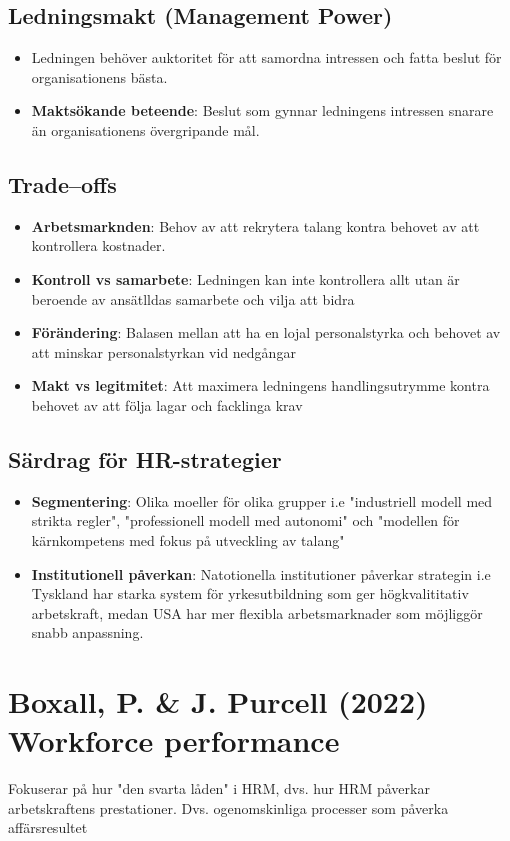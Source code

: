 \documentclass[12pt,a4paper]{article}
\begin{document}
\subsection{Ledningsmakt (Management Power)}
\begin{itemize}
    \item Ledningen behöver auktoritet för att samordna intressen och fatta beslut för organisationens bästa.
    \item \textbf{Maktsökande beteende}: Beslut som gynnar ledningens intressen snarare än organisationens övergripande mål.
\end{itemize}

\subsection{Trade--offs}
\begin{itemize}
    \item \textbf{Arbetsmarknden}: Behov av att rekrytera talang kontra behovet av att kontrollera kostnader.
    \item \textbf{Kontroll vs samarbete}: Ledningen kan inte kontrollera allt utan är beroende av ansätlldas samarbete och vilja att bidra
    \item \textbf{Förändering}: Balasen mellan att ha en lojal personalstyrka och behovet av att minskar personalstyrkan vid nedgångar
    \item \textbf{Makt vs legitmitet}: Att maximera ledningens handlingsutrymme kontra behovet av att följa lagar och facklinga krav
\end{itemize}

\subsection{Särdrag för HR-strategier}
\begin{itemize}
    \item \textbf{Segmentering}: Olika moeller för olika grupper i.e "industriell modell med strikta regler", "professionell modell med autonomi" och "modellen för kärnkompetens med fokus på utveckling av talang"
    \item \textbf{Institutionell påverkan}: Natotionella institutioner påverkar strategin i.e Tyskland har starka system för yrkesutbildning som ger högkvalititativ arbetskraft, medan USA har mer flexibla arbetsmarknader som möjliggör snabb anpassning.
\end{itemize}

\section{Boxall, P. \& J. Purcell (2022) Workforce performance}
Fokuserar på hur "den svarta låden" i HRM, dvs. hur HRM påverkar arbetskraftens prestationer. Dvs.
ogenomskinliga processer som påverka affärsresultet
\end{document}
